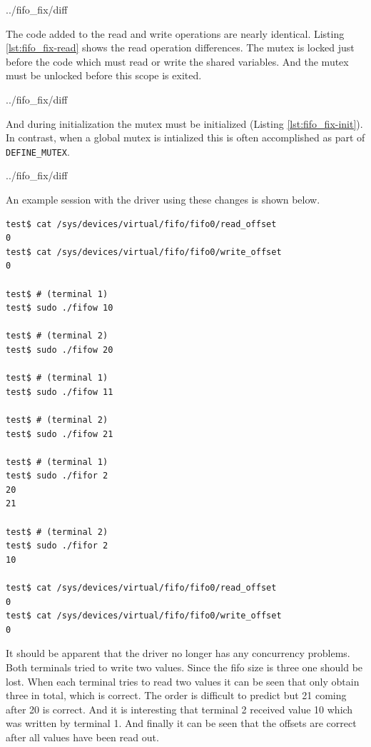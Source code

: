 \documentclass{article}
\begin{document}

	{../fifo_fix/diff}

The code added to the read and write operations are nearly identical.
Listing \ref{lst:fifo_fix-read} shows the read operation differences.
The mutex is locked just before the code which must read or write the
shared variables.
And the mutex must be unlocked before this scope is exited.


	{../fifo_fix/diff}

And during initialization the mutex must be initialized
(Listing \ref{lst:fifo_fix-init}).
In contrast, when a global mutex is intialized this is often
accomplished as part of \verb+DEFINE_MUTEX+.


	{../fifo_fix/diff}

\begin{samepage}
An example session with the driver using these changes is shown below.

\begin{verbatim}
test$ cat /sys/devices/virtual/fifo/fifo0/read_offset
0
test$ cat /sys/devices/virtual/fifo/fifo0/write_offset
0

test$ # (terminal 1)
test$ sudo ./fifow 10

test$ # (terminal 2)
test$ sudo ./fifow 20

test$ # (terminal 1)
test$ sudo ./fifow 11

test$ # (terminal 2)
test$ sudo ./fifow 21

test$ # (terminal 1)
test$ sudo ./fifor 2
20
21

test$ # (terminal 2)
test$ sudo ./fifor 2
10

test$ cat /sys/devices/virtual/fifo/fifo0/read_offset
0
test$ cat /sys/devices/virtual/fifo/fifo0/write_offset
0
\end{verbatim}

It should be apparent that the driver no longer has any concurrency
problems.
Both terminals tried to write two values.
Since the fifo size is three one should be lost.
When each terminal tries to read two values it can be seen that only
obtain three in total, which is correct.
The order is difficult to predict but 21 coming after 20 is correct.
And it is interesting that terminal 2 received value 10 which was
written by terminal 1.
And finally it can be seen that the offsets are correct after all
values have been read out.

\end{samepage}

\pagebreak
\printbibliography

\end{document}
